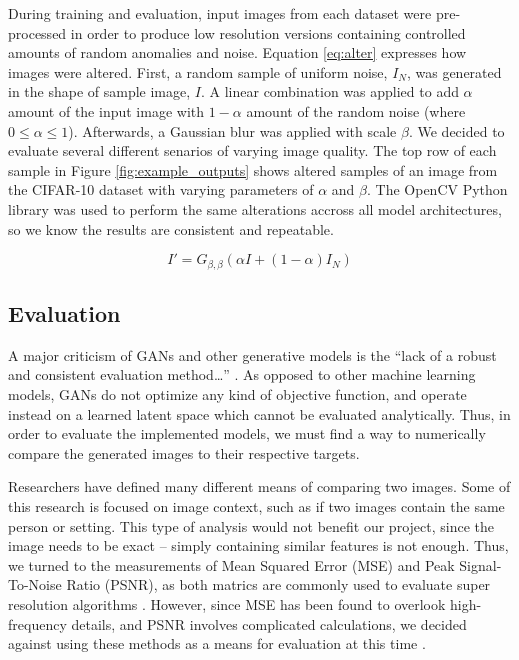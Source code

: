 \documentclass[letterpaper]{article} %
\begin{document}
During training and evaluation, input images from each dataset were pre-processed
in order to produce low resolution versions containing controlled amounts of random anomalies and noise.
Equation \ref{eq:alter} expresses how images were altered.
First, a random sample of uniform noise, $I_{N}$, was generated in the shape of
sample image, $I$. A linear combination was applied to add $\alpha$ amount of the input
image with $1 - \alpha$ amount of the random noise
(where $0 \leq \alpha \leq 1$).
Afterwards, a Gaussian blur was applied with scale $\beta$.
We decided to evaluate several different senarios of varying image quality.
The top row of each sample in Figure \ref{fig:example_outputs} shows altered samples
of an image from the CIFAR-10 dataset with varying parameters of $\alpha$ and $\beta$.
The OpenCV Python library was used to perform the same alterations accross all model architectures,
so we know the results are consistent and repeatable.

\begin{equation}
\label{eq:alter}
I' = G_{\beta,\beta}(\alpha I + (1 - \alpha)I_{N})
\end{equation}

\subsection{Evaluation}
A major criticism of GANs and other generative models is the
``lack of a robust and consistent evaluation method\dots''
\cite{gmm}.
As opposed to other machine learning models, GANs do not optimize any kind of objective function,
and operate instead on a learned latent space
which cannot be evaluated analytically.
Thus, in order to evaluate the implemented models,
we must find a way to numerically compare the generated images to their respective targets.

Researchers have defined many different means of comparing two images.
Some of this research is focused on image context, such as if two images contain the same
person or setting.
This type of analysis would not benefit our project,
since the image needs to be exact --
simply containing similar features is not enough.
Thus, we turned to the measurements of
Mean Squared Error (MSE) and Peak Signal-To-Noise Ratio (PSNR),
as both matrics are commonly used to evaluate super resolution algorithms
\cite{super_resolution}.
However, since MSE has been found to overlook high-frequency details,
and PSNR involves complicated calculations,
we decided against using these methods as a means for evaluation
at this time
\cite{srgan}.
\end{document}
